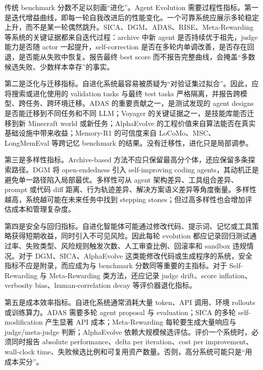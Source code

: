 传统 benchmark 分数不足以刻画“进化”。Agent Evolution 需要过程性指标。第一是迭代增益曲线，即每一轮自我改进后的性能变化。一个可靠系统应展示多轮稳定上升，而不是某一轮偶然跳升。SICA、DGM、ADAS、RISE、Meta-Rewarding 等系统的关键证据都来自迭代过程：archive 中新 agent 是否持续优于祖先，judge 能力是否随 actor 一起提升，self-correction 是否在多轮内单调改善，是否存在回退，是否能从失败中恢复。报告最终 best score 而不报告完整曲线，会掩盖“多数候选失败、少数样本幸存”的事实。

第二是泛化与迁移指标。自进化系统最容易被质疑为“对验证集过拟合”。因此，应将搜索或进化使用的 validation tasks 与最终 test tasks 严格隔离，并报告跨模型、跨任务、跨环境迁移。ADAS 的重要贡献之一，是测试发现的 agent designs 是否能迁移到不同任务和不同 LLM；Voyager 的关键证据之一，是技能库能否迁移到新 Minecraft world 或新任务；AlphaEvolve 的工程价值来自算法能否在真实基础设施中带来收益；Memory-R1 的可信度来自 LoCoMo、MSC、LongMemEval 等跨记忆 benchmark 的结果。没有迁移性，进化只是局部调参。

第三是多样性指标。Archive-based 方法不应只保留最高分个体，还应保留多条探索路径。DGM 将 open-endedness 引入 self-improving coding agents，其动机正是避免单一路径陷入局部最优。多样性可从 agent 架构差异、工具组合差异、prompt 或代码 diff 距离、行为轨迹差异、解决方案语义差异等角度衡量。多样性越高，系统越可能在未来任务中找到 stepping stones；但过高多样性也会增加评估成本和管理复杂度。

第四是安全与回归指标。自进化智能体可能通过修改代码、提示词、记忆或工具策略获得短期收益，同时引入不可见风险。因此每轮 evolution 都应记录回归测试通过率、失败类型、风险规则触发次数、人工审查比例、回滚率和 sandbox 违规情况。对于 DGM、SICA、AlphaEvolve 这类能修改代码或生成程序的系统，安全指标不应是附录，而应成为与 benchmark 分数同等重要的主指标。对于 Self-Rewarding 与 Meta-Rewarding 类方法，还应记录 judge drift、score inflation、verbosity bias、human-correlation decay 等评价器退化指标。

第五是成本效率指标。自进化系统通常消耗大量 token、API 调用、环境 rollouts 或训练算力。ADAS 需要多轮 agent proposal 与 evaluation；SICA 的多轮 self-modification 产生显著 API 成本；Meta-Rewarding 每轮要生成大量响应与 judge/meta-judge 判断；AlphaEvolve 依赖大规模候选评估。评价一个系统时，必须同时报告 absolute performance、delta per iteration、cost per improvement、wall-clock time、失败候选比例和可复用资产数量。否则，高分系统可能只是“用成本买分”。

